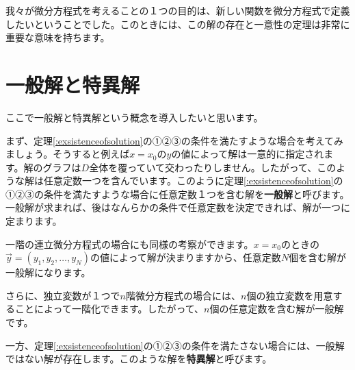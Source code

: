 \documentclass[report,paper=a4, fontsize=12pt, line_length=16cm, number_of_lines=33,dvipdfmx]{jlreq}
\numberwithin{equation}{section}
\newcommand{\strong}[1]{\textsf{\bfseries #1}}
\newcommand{\yv}{\vec{y}}
\begin{document}
我々が微分方程式を考えることの１つの目的は、新しい関数を微分方程式で定義したいということでした。このときには、この解の存在と一意性の定理は非常に重要な意味を持ちます。

\section{一般解と特異解}
ここで一般解と特異解という概念を導入したいと思います。

まず、定理\ref{:exsistenceofsolution}の①②③の条件を満たすような場合を考えてみましょう。そうすると例えば$x=x_0$の$y$の値によって解は一意的に指定されます。解のグラフは$D$全体を覆っていて交わったりしません。したがって、このような解は任意定数一つを含んでいます。このように定理\ref{:exsistenceofsolution}の①②③の条件を満たすような場合に任意定数１つを含む解を\strong{一般解}と呼びます。一般解が求まれば、後はなんらかの条件で任意定数を決定できれば、解が一つに定まります。

一階の連立微分方程式の場合にも同様の考察ができます。$x=x_0$のときの$\yv=(y_1,y_2,\dots,y_N)$の値によって解が決まりますから、任意定数$N$個を含む解が一般解になります。

さらに、独立変数が１つで$n$階微分方程式の場合には、$n$個の独立変数を用意することによって一階化できます。したがって、$n$個の任意定数を含む解が一般解です。

一方、定理\ref{:exsistenceofsolution}の①②③の条件を満たさない場合には、一般解ではない解が存在します。このような解を\strong{特異解}と呼びます。
\end{document}
